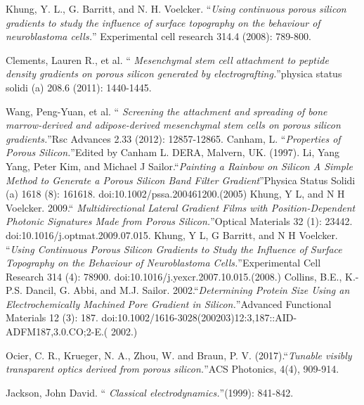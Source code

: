 \documentclass{article}
\begin{document}
\begin{thebibliography}{X}
 Khung, Y. L., G. Barritt, and
  N. H. Voelcker. \textquotedblleft \emph{Using continuous porous
    silicon gradients to study the influence of surface topography
    on the behaviour of neuroblastoma cells.}\textquotedblright
  Experimental cell research 314.4 (2008): 789-800.

 Clements, Lauren R., et al. \textquotedblleft
  \emph{Mesenchymal stem cell attachment to peptide density
    gradients on porous silicon generated by
    electrografting.}\textquotedblright physica status solidi (a)
  208.6 (2011): 1440-1445.

 Wang, Peng-Yuan, et al. \textquotedblleft
  \emph{Screening the attachment and spreading of bone
    marrow-derived and adipose-derived mesenchymal stem cells on
    porous silicon gradients.}\textquotedblright Rsc Advances 2.33
  (2012): 12857-12865.
 Canham, L. \textquotedblleft \emph{Properties of
    Porous Silicon.}\textquotedblright Edited by Canham L. DERA,
  Malvern, UK. (1997).
 Li, Yang Yang, Peter Kim, and Michael J
  Sailor.\textquotedblleft \emph{Painting a Rainbow on Silicon A
    Simple Method to Generate a Porous Silicon Band Filter
    Gradient}\textquotedblright Physica Status Solidi (a) 1618 (8):
  161618. doi:10.1002/pssa.200461200.(2005)
 Khung, Y L, and N H
  Voelcker. 2009.\textquotedblleft\emph{ Multidirectional Lateral
    Gradient Films with Position-Dependent Photonic Signatures Made
    from Porous Silicon.}\textquotedblright Optical Materials 32
  (1): 23442. doi:10.1016/j.optmat.2009.07.015.
  Khung, Y L, G Barritt, and N H Voelcker.
  \textquotedblleft \emph{Using Continuous Porous Silicon Gradients
    to Study the Influence of Surface Topography on the Behaviour of
    Neuroblastoma Cells.}\textquotedblright Experimental Cell
  Research 314 (4): 78900. doi:10.1016/j.yexcr.2007.10.015.(2008.)
 Collins, B.E., K.-P.S. Dancil, G. Abbi, and
  M.J. Sailor. 2002.\textquotedblleft \emph{Determining Protein Size
    Using an Electrochemically Machined Pore Gradient in
    Silicon.}\textquotedblright Advanced Functional Materials 12 (3):
  187. doi:10.1002/1616-3028(200203)12:3,187::AID-ADFM187,3.0.CO;2-E.(
  2002.)

 Ocier, C. R., Krueger, N. A., Zhou, W. and  Braun,
  P. V. (2017).\textquotedblleft \emph{Tunable visibly transparent
    optics derived from porous silicon.}\textquotedblright ACS
  Photonics, 4(4), 909-914.
  
   
  Jackson, John David. \textquotedblleft 
  \emph{Classical electrodynamics.}\textquotedblright (1999): 841-842.
  

\end{thebibliography}
\end{document}
